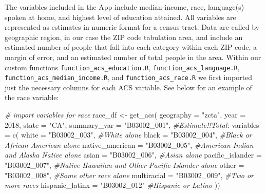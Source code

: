 \documentclass[
  11 pt,
  openany]{book}
\newenvironment{Shaded}{\begin{snugshade}}{\end{snugshade}}
\newcommand{\AttributeTok}[1]{\textcolor[rgb]{0.77,0.63,0.00}{#1}}
\newcommand{\CommentTok}[1]{\textcolor[rgb]{0.56,0.35,0.01}{\textit{#1}}}
\newcommand{\DecValTok}[1]{\textcolor[rgb]{0.00,0.00,0.81}{#1}}
\newcommand{\FunctionTok}[1]{\textcolor[rgb]{0.00,0.00,0.00}{#1}}
\newcommand{\NormalTok}[1]{#1}
\newcommand{\OtherTok}[1]{\textcolor[rgb]{0.56,0.35,0.01}{#1}}
\newcommand{\StringTok}[1]{\textcolor[rgb]{0.31,0.60,0.02}{#1}}
\begin{document}
The variables included in the App include median-income, race, language(s) spoken at home, and highest level of education attained. All variables are represented as estimates in numeric format for a census tract. Data are called by geographic region, in our case the ZIP code tabulation area, and include an estimated number of people that fall into each category within each ZIP code, a margin of error, and an estimated number of total people in the area. Within our custom functions \texttt{function\_acs\_education.R}, \texttt{function\_acs\_language.R}, \texttt{function\_acs\_median\_income.R}, and \texttt{function\_acs\_race.R} we first imported just the necessary columns for each ACS variable. See below for an example of the race variable:

\begin{Shaded}
\begin{Highlighting}[]
\CommentTok{\# import variables for race}
\NormalTok{race\_df }\OtherTok{\textless{}{-}} 
  \FunctionTok{get\_acs}\NormalTok{(}
    \AttributeTok{geography =} \StringTok{"zcta"}\NormalTok{, }\AttributeTok{year =} \DecValTok{2018}\NormalTok{,}
    \AttributeTok{state =} \StringTok{"CA"}\NormalTok{,}
    \AttributeTok{summary\_var =} \StringTok{"B03002\_001"}\NormalTok{, }\CommentTok{\#Estimate!!Total: }
    \AttributeTok{variables =} \FunctionTok{c}\NormalTok{(}
      \AttributeTok{white =} \StringTok{"B03002\_003"}\NormalTok{, }\CommentTok{\#White alone}
      \AttributeTok{black =} \StringTok{"B03002\_004"}\NormalTok{, }\CommentTok{\#Black or African American alone}
      \AttributeTok{native\_american =} \StringTok{"B03002\_005"}\NormalTok{, }\CommentTok{\#American Indian and Alaska Native alone}
      \AttributeTok{asian =} \StringTok{"B03002\_006"}\NormalTok{, }\CommentTok{\#Asian alone}
      \AttributeTok{pacific\_islander =} \StringTok{"B03002\_007"}\NormalTok{, }\CommentTok{\#Native Hawaiian and Other Pacific Islander alone}
      \AttributeTok{other =} \StringTok{"B03002\_008"}\NormalTok{, }\CommentTok{\#Some other race alone}
      \AttributeTok{multiracial =} \StringTok{"B03002\_009"}\NormalTok{, }\CommentTok{\#Two or more races}
      \AttributeTok{hispanic\_latinx =} \StringTok{"B03002\_012"} \CommentTok{\#Hispanic or Latino}
\NormalTok{    ))}
\end{Highlighting}
\end{Shaded}
\end{document}
